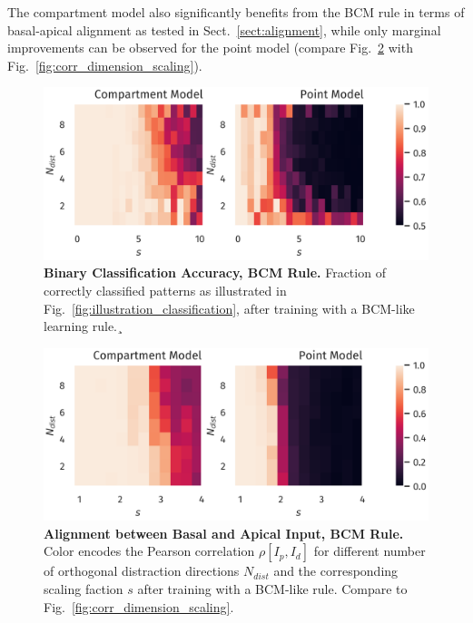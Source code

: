 \documentclass[10pt,a4paper,twocolumn]{article}
\begin{document}
		The compartment model also significantly benefits from
		the BCM rule in terms of basal-apical alignment as tested in Sect.~\ref{sect:alignment}, 
		while only marginal
		improvements can be observed for the point model
		(compare Fig.~\ref{fig:corr_dimension_scaling_bcm} 
		with Fig.~\ref{fig:corr_dimension_scaling}).
		
		\begin{figure}
			\includegraphics[width=\columnwidth]{classification_dimension_scaling_bcm}
			\caption{{\bf Binary Classification Accuracy, BCM Rule.}
				Fraction of correctly classified patterns as illustrated in
				Fig.~\ref{fig:illustration_classification}, after training with
				a BCM-like learning rule.¸}
			\label{fig:classification_accuracy_bcm}
		\end{figure}
		
		\begin{figure}
			\includegraphics[width=\columnwidth]{corr_dimension_scaling_bcm}
			\caption{{\bf Alignment between Basal and Apical Input, BCM Rule.}
				Color encodes the Pearson correlation $\rho[I_p,I_d]$ for different
				number of orthogonal distraction directions $N_{dist}$ 
				and the corresponding scaling faction $s$ after training
				with a BCM-like rule. Compare to Fig.~\ref{fig:corr_dimension_scaling}.}
			\label{fig:corr_dimension_scaling_bcm}
		\end{figure}
		
\end{document}

